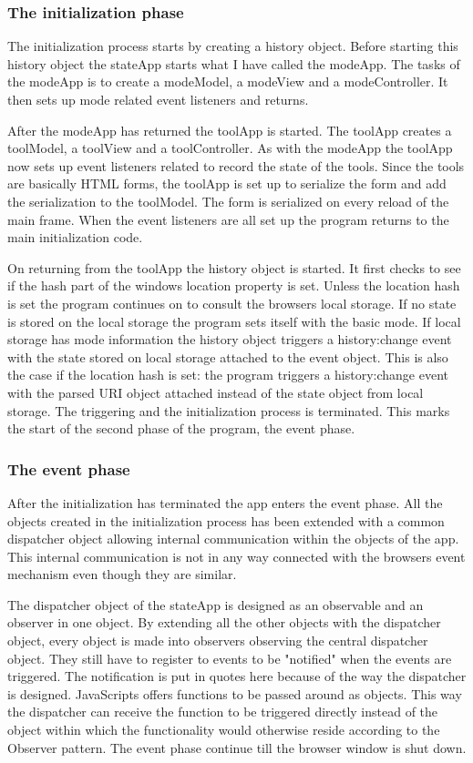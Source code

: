 \documentclass[english]{ifimaster}
\begin{document}
\subsubsection{The initialization phase} 
The initialization process starts by creating a history object. Before starting this history object the stateApp starts what I have called the modeApp. The tasks of the modeApp is to create a modeModel, a modeView and a modeController. It then sets up mode related event listeners and returns.

After the modeApp has returned the toolApp is started. The toolApp creates a toolModel, a toolView and a toolController. As with the modeApp the toolApp now sets up event listeners related to record the state of the tools. Since the tools are basically HTML forms, the toolApp is set up to serialize the form and add the serialization to the toolModel. The form is serialized on every reload of the main frame. When the event listeners are all set up the program returns to the main initialization code.

On returning from the toolApp the history object is started. It first checks to see if the hash part of the windows location property is set. Unless the location hash is set the program continues on to consult the browsers local storage. If no state is stored on the local storage the program sets itself with the basic mode. If local storage has mode information the history object triggers a history:change event with the state stored on local storage attached to the event object. This is also the case if the location hash is set: the program triggers a history:change event with the parsed URI object attached instead of the state object from local storage. The triggering and the initialization process is terminated. This marks the start of the second phase of the program, the event phase.

\subsubsection{The event phase}
After the initialization has terminated the app enters the event phase. All the objects created in the initialization process has been extended with a common dispatcher object allowing internal communication within the objects of the app. This internal communication is not in any way connected with the browsers event mechanism even though they are similar.

The dispatcher object of the stateApp is designed as an observable and an observer in one object. By extending all the other objects with the dispatcher object, every object is made into observers observing the central dispatcher object. They still have to register to events to be "notified" when the events are triggered. The notification is put in quotes here because of the way the dispatcher is designed. JavaScripts offers functions to be passed around as objects. This way the dispatcher can receive the function to be triggered directly instead of the object within which the functionality would otherwise reside according to the Observer pattern. The event phase continue till the browser window is shut down. 
\end{document}
